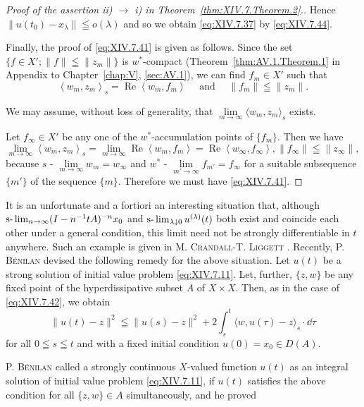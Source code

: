 \begin{proof}[Proof of the assertion ii) $\rightarrow$ i) in Theorem~\ref{thm:XIV.7.Theorem.2}.]
Hence $\|u(t_0) - x_{\lambda}\| \leqq o(\lambda)$ and so we obtain \eqref{eq:XIV.7.37} by \eqref{eq:XIV.7.44}. 

Finally, the proof of \eqref{eq:XIV.7.41} is given as follows. Since the set $\{f\in X';\|f\|\leqq \|z_m\|\}$ is $w^*$-compact (Theorem~\ref{thm:AV.1.Theorem.1} in Appendix to Chapter~\ref{chap:V}, \ref{sec:AV.1}), we can find $f_{m}\in X'$ such that 
\[
\left\langle w _{m}, z _{m} \right\rangle_{s} = \operatorname{Re} \left\langle w _{m}, f _{m} \right\rangle \quad \text{ and } \quad \| f _{m} \| \leqq \| z _{m} \|.
\]

We may assume, without loss of generality, that $\lim\limits_{m\to \infty}\langle w_m,z_m\rangle_s$ exists. 

Let $f_{\infty} \in X'$ be any one of the $w^*$-accumulation points of $\{f_m\}$. Then we have 
\[
\lim\limits _{m \rightarrow \infty} \left\langle w _{m}, z _{m} \right\rangle_{s} = \lim\limits _{m \rightarrow \infty} \operatorname{Re} \left\langle w _{m}, f _{m} \right\rangle = \operatorname{Re} \left\langle w _{\infty}, f _{\infty} \right\rangle , \| f _{\infty} \| \leqq \| z _{\infty} \|,
\]
because $s$ - $\lim\limits_{m \to \infty} w_m = w_\infty$ and $w^*$ - $\lim\limits_{m' \to \infty} f_{m'} = f_\infty$ for a suitable subsequence 
$\{m'\}$ of the sequence $\{m\}$. Therefore we must have \eqref{eq:XIV.7.41}. 
\end{proof}

\begin{remarku} It is an unfortunate and a fortiori an interesting situation that, although $\text{s-}\lim\nolimits_{n\to \infty}(I - n^{-1}tA)^{-n}x_0$ and $\text{s-}\lim\nolimits_{\lambda \downarrow 0}u^{(\lambda)}(t)$ both exist and coincide each other under a general condition, this limit need not be strongly differentiable in $t$ anywhere. Such an example is given in M. \textsc{Crandall}-T. \textsc{Liggett} \cite{clarkson37}. Recently, P. \textsc{Bénilan} \cite{benilan13} devised the following remedy for the above situation. Let $u(t)$ be a strong solution of initial value problem \eqref{eq:XIV.7.11}. Let, further, $\{z,w\}$ be any fixed point of the hyperdissipative subset $A$ of $X\times X$. Then, as in the case of \eqref{eq:XIV.7.42}, we obtain 
\[
\|u(t)-z\|^2\leqq\|u(s)-z\|^2+2\int_s^t\langle w,u(\tau)-z\rangle_s\cdot\dd\tau
\]
for all $0\leqq s\leqq t$ and with a fixed initial condition $u(0)=x_0\in D(A)$.
\end{remarku}

P. \textsc{Bénilan} \cite{benilan13} called a strongly continuous $X$-valued function $u(t)$ as an integral solution of initial value problem \eqref{eq:XIV.7.11}, if $u(t)$ satisfies the above condition for all $\{z, w\} \in A$ simultaneously, and he proved 

